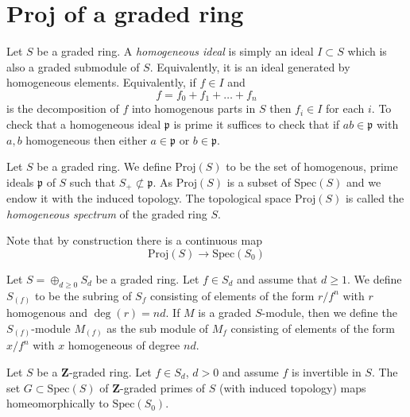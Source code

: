 \section{Proj of a graded ring}
\label{section-proj}

\noindent
Let $S$ be a graded ring.
A {\it homogeneous ideal} is simply an ideal
$I \subset S$ which is also a graded submodule of $S$.
Equivalently, it is an ideal generated by homogeneous elements.
Equivalently, if $f \in I$ and 
$$
f = f_0 + f_1 + \ldots + f_n
$$
is the decomposition of $f$ into homogenous parts in $S$ then $f_i \in I$
for each $i$. To check that a homogeneous ideal $\mathfrak p$
is prime it suffices to check that if $ab \in \mathfrak p$
with $a, b$ homogeneous then either $a \in \mathfrak p$ or
$b \in \mathfrak p$.

\begin{definition}
\label{definition-proj}
Let $S$ be a graded ring.
We define $\text{Proj}(S)$ to be the set of homogenous,
prime ideals $\mathfrak p$ of $S$ such that
$S_{+} \not \subset \mathfrak p$.
As $\text{Proj}(S)$ is a subset of $\text{Spec}(S)$
and we endow it with the induced topology.
The topological space $\text{Proj}(S)$ is called the
{\it homogeneous spectrum} of the graded ring $S$.
\end{definition}

\noindent
Note that by construction there is a continuous map
$$
\text{Proj}(S) \longrightarrow \text{Spec}(S_0)
$$

\medskip\noindent
Let $S = \oplus_{d \geq 0} S_d$ be a graded ring.
Let $f\in S_d$ and assume that $d \geq 1$.
We define $S_{(f)}$ to be the subring of $S_f$
consisting of elements of the form $r/f^n$ with $r$ homogenous and
$\deg(r) = nd$. If $M$ is a graded $S$-module,
then we define the $S_{(f)}$-module $M_{(f)}$ as the
sub module of $M_f$ consisting of elements of
the form $x/f^n$ with $x$ homogeneous of degree $nd$.

\begin{lemma}
\label{lemma-Z-graded}
Let $S$ be a $\mathbf{Z}$-graded ring.
Let $f \in S_d$, $d > 0$ and assume $f$ is invertible in $S$.
The set $G \subset \text{Spec}(S)$ of $\mathbf{Z}$-graded primes of $S$ 
(with induced topology) maps homeomorphically to $\text{Spec}(S_0)$.
\end{lemma}

